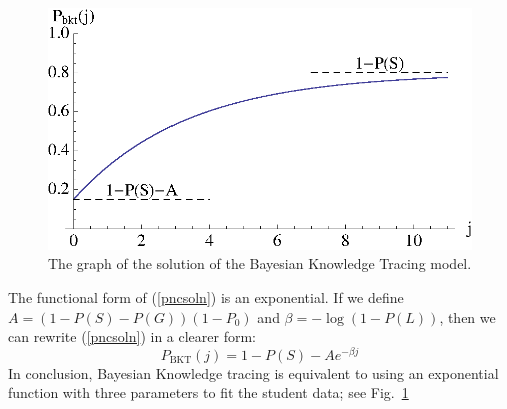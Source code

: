 \documentclass[11pt,letterpaper]{article}
\begin{document}
\begin{figure}
  \centering \includegraphics{exponential.eps}
   \caption{The graph of the solution of the Bayesian Knowledge
     Tracing model.}
    \label{bkt-function}
\end{figure}

The functional form of (\ref{pncsoln}) is an exponential.
If we define 
$A=\left(1-P(S)-P(G)\right) \left(1-P_0\right)$ and
$\beta=-\log(1-P(L))$, then we can rewrite (\ref{pncsoln}) in 
a clearer form:
%
\begin{equation}
         P_\mathrm{BKT}(j) = 1-P(S) -A e^{-\beta j}
\end{equation}
%
In conclusion, Bayesian Knowledge tracing is equivalent to using
an exponential function with three parameters to fit the student data;
see Fig.~\ref{bkt-function}


%
%
\end{document}
